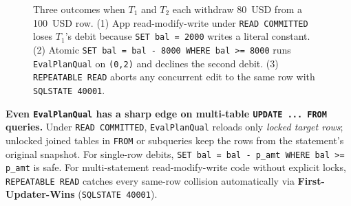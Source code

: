 \begin{figure}[H]
\caption{Three outcomes when $T_1$ and $T_2$ each withdraw 80~USD from a 100~USD row. (1) App read-modify-write under \texttt{READ COMMITTED} loses $T_1$'s debit because \texttt{SET bal = 2000} writes a literal constant. (2) Atomic \texttt{SET bal = bal - 8000 WHERE bal >= 8000} runs \texttt{EvalPlanQual} on \texttt{(0,2)} and declines the second debit. (3) \texttt{REPEATABLE READ} aborts any concurrent edit to the same row with \texttt{SQLSTATE 40001}.}
\label{ch06:fig-lost-update-epq}
\end{figure}

\begin{trapbox}
\textbf{Even \texttt{EvalPlanQual} has a sharp edge on multi-table \texttt{UPDATE ... FROM} queries.}
Under \texttt{READ COMMITTED}, \texttt{EvalPlanQual} reloads only \emph{locked target rows}; unlocked joined tables in \texttt{FROM} or subqueries keep the rows from the statement's original snapshot. For single-row debits, \texttt{SET bal = bal - p\_amt WHERE bal >= p\_amt} is safe. For multi-statement read-modify-write code without explicit locks, \texttt{REPEATABLE READ} catches every same-row collision automatically via \textbf{First-Updater-Wins} (\texttt{SQLSTATE 40001}).
\end{trapbox}

